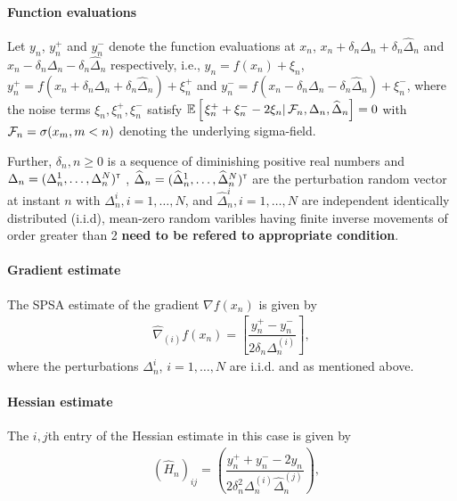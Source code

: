 \documentclass[twocolumn]{IEEEtran}
\begin{document}
\paragraph{\textbf{Function evaluations}}
Let $y_n$, $y_n^+$ and $y_n^-$ denote the function evaluations at $x_n$, $x_n+\delta_n \Delta_n+\delta_n \widehat \Delta_n$ and $x_n -\delta_n\Delta_n-\delta_n\widehat\Delta_n$ respectively, i.e., 
$y_n = f(x_n) + \xi_n$, $y_n^+ = f(x_n+\delta_n \Delta_n +\delta_n \widehat\Delta_n) + \xi_n^+$ and 
$y_n^- = f(x_n -\delta_n\Delta_n-\delta_n\widehat\Delta_n) + \xi_n^-$,
where the noise terms $\xi_n, \xi_n^+, \xi_n^-$ satisfy $\mathbb{E}\left[\left.\xi_n^+ + \xi_n^- - 2\xi_n \right| \mathcal{F}_n, \Delta_n, \widehat \Delta_n\right] = 0$ with $\mathcal{F}_n = \sigma(x_m,m <  n)$ denoting the underlying sigma-field.

Further, $\delta_n, n\geq 0$ is a sequence of diminishing positive real numbers and $\Delta_n = (\Delta_n^1,\ldots,\Delta_n^N)^\mathsf{\scriptscriptstyle T}$ , $\widehat\Delta_n = (\widehat\Delta_n^1,\ldots,\widehat\Delta_n^N)^\mathsf{\scriptscriptstyle T}$ are the perturbation random vector at instant $n$ with $\Delta_n^i,i=1,\ldots,N$, and $\widehat\Delta_n^i,i=1,\ldots,N$ are independent identically distributed (i.i.d), mean-zero random varibles having finite inverse movements of order greater than 2 \textbf{need to be refered to appropriate condition}.  

\paragraph{\textbf{Gradient estimate}}
The SPSA estimate of the gradient $\nabla f(x_n)$ is given by
\begin{align}
\label{eq:grad-spsa}
\widehat\nabla_{(i)} f(x_n) =  \left[ \dfrac{y_n^+ - y_n^-}{2\delta_n \Delta_n^{(i)}}\right],
\end{align}
where the perturbations $\Delta_n^i$, $i=1,\ldots,N$ are i.i.d. and as mentioned above.


\paragraph{\textbf{Hessian estimate}}
The $i,j$th entry of the Hessian estimate in this case is given by
\begin{align}
\label{eq:2spsa-ber}
&\left(\widehat H_n\right)_{ij} =  \left(\dfrac{y_n^+ + y_n^- - 2 y_n}{2\delta_n^2 \Delta_n^{(i)} \widehat \Delta_n^{(j)}}\right), 
\end{align}
\end{document}
